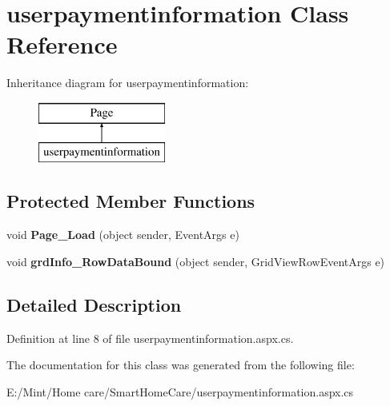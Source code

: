 \hypertarget{classuserpaymentinformation}{\section{userpaymentinformation Class Reference}
\label{classuserpaymentinformation}
}
Inheritance diagram for userpaymentinformation\-:\begin{figure}[H]
\begin{center}
\leavevmode
\includegraphics[height=2.000000cm]{classuserpaymentinformation}
\end{center}
\end{figure}
\subsection*{Protected Member Functions}
\begin{DoxyCompactItemize}
\item 
\hypertarget{classuserpaymentinformation_a6f1d2533f356ab449415613755a01726}{void {\bfseries Page\-\_\-\-Load} (object sender, Event\-Args e)}\label{classuserpaymentinformation_a6f1d2533f356ab449415613755a01726}

\item 
\hypertarget{classuserpaymentinformation_af60e50e556720f6883a25026754fd77f}{void {\bfseries grd\-Info\-\_\-\-Row\-Data\-Bound} (object sender, Grid\-View\-Row\-Event\-Args e)}\label{classuserpaymentinformation_af60e50e556720f6883a25026754fd77f}

\end{DoxyCompactItemize}


\subsection{Detailed Description}


Definition at line 8 of file userpaymentinformation.\-aspx.\-cs.



The documentation for this class was generated from the following file\-:\begin{DoxyCompactItemize}
\item 
E\-:/\-Mint/\-Home care/\-Smart\-Home\-Care/userpaymentinformation.\-aspx.\-cs\end{DoxyCompactItemize}
